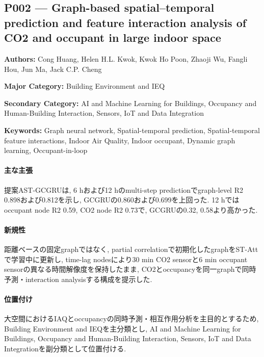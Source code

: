 \subsection{P002 --- Graph-based spatial–temporal prediction and feature interaction analysis of CO2 and occupant in large indoor space}
\label{paper:P002}
\textbf{Authors:} Cong Huang, Helen H.L. Kwok, Kwok Ho Poon, Zhaoji Wu, Fangli Hou, Jun Ma, Jack C.P. Cheng\par
\textbf{Major Category:} Building Environment and IEQ\par
\textbf{Secondary Category:} AI and Machine Learning for Buildings, Occupancy and Human-Building Interaction, Sensors, IoT and Data Integration\par
\textbf{Keywords:} Graph neural network, Spatial-temporal prediction, Spatial-temporal feature interactions, Indoor Air Quality, Indoor occupant, Dynamic graph learning, Occupant-in-loop\par
\paragraph{主な主張}
提案AST-GCGRUは, 6 hおよび12 hのmulti-step predictionでgraph-level R2 0.898および0.812を示し, GCGRUの0.860および0.699を上回った. 12 hではoccupant node R2 0.59, CO2 node R2 0.73で, GCGRUの0.32, 0.58より高かった. \cite{Huang:2025GraphCO2Occupant}
\paragraph{新規性}
距離ベースの固定graphではなく, partial correlationで初期化したgraphをST-Attで学習中に更新し, time-lag nodesにより30 min CO2 sensorと6 min occupant sensorの異なる時間解像度を保持したまま, CO2とoccupancyを同一graphで同時予測・interaction analysisする構成を提示した.
\paragraph{位置付け}
大空間におけるIAQとoccupancyの同時予測・相互作用分析を主目的とするため, Building Environment and IEQを主分類とし, AI and Machine Learning for Buildings, Occupancy and Human-Building Interaction, Sensors, IoT and Data Integrationを副分類として位置付ける.
